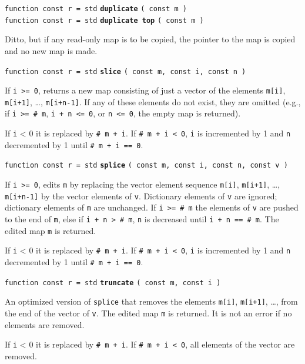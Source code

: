 \documentclass[12pt]{article}
\newcommand{\ttkey}[1]{{\tt \bfseries #1}}
\newenvironment{indpar}[1][0.3in]%
	{\begin{list}{}%
		     {\setlength{\itemsep}{0in}%
		      \setlength{\topsep}{0in}%
		      \setlength{\parsep}{1ex}%
		      \setlength{\labelwidth}{#1}%
		      \setlength{\leftmargin}{#1}%
		      \addtolength{\leftmargin}{\labelsep}}%
	 \item}%
	{\end{list}}
\begin{document}
{\tt function const r = std} \ttkey{duplicate} {\tt ( const m )} \\
{\tt function const r = std} \ttkey{duplicate top} {\tt ( const m )}
\begin{indpar}
Ditto, but if any read-only map is to be copied, the pointer
to the map is copied and no new map is made.
\end{indpar}

{\tt function const r = std} \ttkey{slice} {\tt ( const m, const i, const n )}
\begin{indpar}
If {\tt i >= 0}, returns a new map consisting of just a vector of the
elements {\tt m[i]}, {\tt m[i+1]}, \ldots, {\tt m[i+n-1]}.  
If any of these elements do not exist, they are omitted (e.g.,
if {\tt i >= \# m}, {\tt i + n <= 0}, or {\tt n <= 0},
the empty map is returned).

If {\tt i} < 0 it is replaced by {\tt \# m + i}.  If {\tt \# m + i < 0},
{\tt i} is incremented by 1 and {\tt n} decremented by 1 until 
{\tt \# m + i == 0}.
\end{indpar}

{\tt function const r = std} \ttkey{splice}
    {\tt ( const m, const i, const n, const v )}
\begin{indpar}
If {\tt i >= 0}, edits {\tt m} by replacing the vector element sequence
{\tt m[i]}, {\tt m[i+1]}, \ldots, {\tt m[i+n-1]} by the
vector elements of {\tt v}.  Dictionary elements of {\tt v} are ignored;
dictionary elements of {\tt m} are unchanged.
If {\tt i >= \# m} the elements of {\tt v} are pushed to the end of {\tt m},
else if {\tt i + n > \# m}, {\tt n} is decreased until {\tt i + n == \# m}.
The edited map {\tt m} is returned.

If {\tt i} < 0 it is replaced by {\tt \# m + i}.  If {\tt \# m + i < 0},
{\tt i} is incremented by 1 and {\tt n} decremented by 1 until 
{\tt \# m + i == 0}.
\end{indpar}

{\tt function const r = std} \ttkey{truncate} {\tt ( const m, const i )}
\begin{indpar}
An optimized version of {\tt splice} that removes the elements
{\tt m[i]}, {\tt m[i+1]}, \ldots, from the end of the vector of {\tt v}.
The edited map {\tt m} is returned.  It is not an error if no elements
are removed.

If {\tt i} < 0 it is replaced by {\tt \# m + i}.  If {\tt \# m + i < 0},
all elements of the vector are removed.
\end{indpar}
\end{document}
